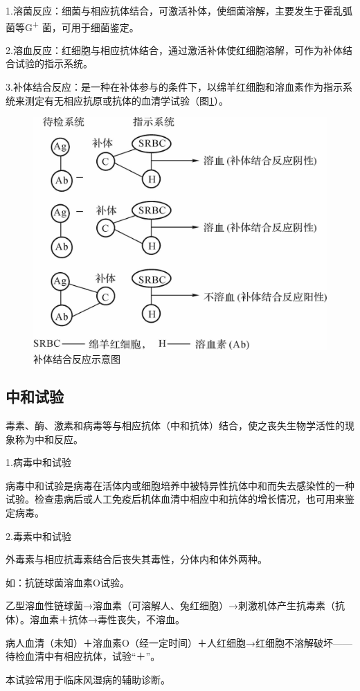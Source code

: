 1.溶菌反应：细菌与相应抗体结合，可激活补体，使细菌溶解，主要发生于霍乱弧菌等G\textsuperscript{+}
菌，可用于细菌鉴定。

2.溶血反应：红细胞与相应抗体结合，通过激活补体使红细胞溶解，可作为补体结合试验的指示系统。

3.补体结合反应：是一种在补体参与的条件下，以绵羊红细胞和溶血素作为指示系统来测定有无相应抗原或抗体的血清学试验（图\ref{fig10-12}）。

\begin{figure}[!htbp]
 \centering
 \includegraphics[width=.6\textwidth]{./images/Image00164.jpg}
 \captionsetup{justification=centering}
 \caption{补体结合反应示意图}
 \label{fig10-12}
  \end{figure} 


\subsection{中和试验}

毒素、酶、激素和病毒等与相应抗体（中和抗体）结合，使之丧失生物学活性的现象称为中和反应。

1.病毒中和试验

病毒中和试验是病毒在活体内或细胞培养中被特异性抗体中和而失去感染性的一种试验。检查患病后或人工免疫后机体血清中相应中和抗体的增长情况，也可用来鉴定病毒。

2.毒素中和试验

外毒素与相应抗毒素结合后丧失其毒性，分体内和体外两种。

如：抗链球菌溶血素O试验。

乙型溶血性链球菌→溶血素（可溶解人、兔红细胞）→刺激机体产生抗毒素（抗体）。溶血素＋抗体→毒性丧失，不溶血。

病人血清（未知）＋溶血素O（经一定时间）＋人红细胞→红细胞不溶解破坏------待检血清中有相应抗体，试验“＋”。

本试验常用于临床风湿病的辅助诊断。


